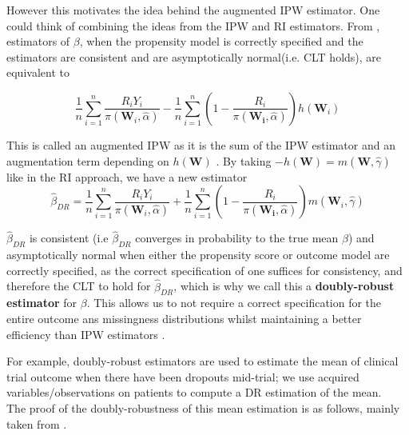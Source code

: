 \documentclass[12pt,twoside]{article}
\begin{document}
However this motivates the idea behind the augmented IPW estimator. One could think of combining the ideas from the IPW and RI estimators. From \citet{davidian}, estimators of $\beta$, when the propensity model is correctly specified and the estimators are consistent and are asymptotically normal(i.e. CLT holds), are equivalent to 

\begin{equation}
    \frac{1}{n}\sum_{i=1}^{n}\frac{R_iY_i}{\pi(\mathbf{W}_i, \hat{\alpha})} - \frac{1}{n}\sum_{i=1}^{n} \left(1 - \frac{R_i}{\pi(\mathbf{W_i},\hat{\alpha})} \right) h(\mathbf{W}_i)
\end{equation}

This is called an augmented IPW as it is the sum of the IPW estimator and an augmentation term depending on $h(\mathbf{W})$ \citep{davidian}. By taking $-h(\mathbf{W}) = m(\mathbf{W}, \hat{\gamma})$ like in the RI approach, we have a new estimator
\begin{equation}
    \hat\beta_{DR} = \frac{1}{n}\sum_{i=1}^{n}\frac{R_iY_i}{\pi(\mathbf{W}_i, \hat{\alpha})} + \frac{1}{n}\sum_{i=1}^{n} \left(1 - \frac{R_i}{\pi(\mathbf{W_i},\hat{\alpha})} \right) m(\mathbf{W}_i, \hat\gamma)
\end{equation}

$\hat\beta_{DR}$ is consistent (i.e $\hat\beta_{DR}$ converges in probability to the true mean $\beta$) and asymptotically normal when either the propensity score or outcome model are correctly specified, as the correct specification of one suffices for consistency, and therefore the CLT to hold for $\hat\beta_{DR}$, which is why we call this a \textbf{doubly-robust estimator} for $\beta$. This allows us to not require a correct specification for the entire outcome ans missingness distributions whilst maintaining a better efficiency than IPW estimators \citep{bangrobins,vansteelandt}.

For example, doubly-robust estimators are used to estimate the mean of clinical trial outcome when there have been dropouts mid-trial; we use acquired variables/observations on patients to compute a DR estimation of the mean. \\

The proof of the doubly-robustness of this mean estimation is as follows, mainly taken from \citet{vansteelandt}.
\end{document}

